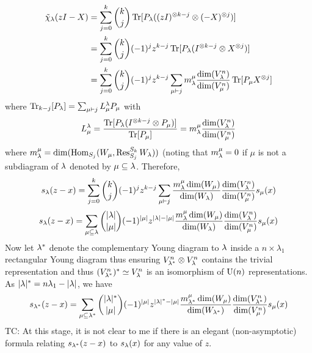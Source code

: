 \documentclass[notitlepage, 10pt]{article}
\begin{document}
    \begin{align}
        \tilde \chi_{\lambda}(zI-X) 
        &= \sum_{j=0}^{k} \binom{k}{j} \operatorname{Tr}[P_{\lambda} ((zI)^{\otimes k-j}\otimes (-X)^{\otimes j})] \\
        &= \sum_{j=0}^{k} \binom{k}{j} (-1)^{j}z^{k-j} \operatorname{Tr}[P_{\lambda} (I^{\otimes k-j} \otimes X^{\otimes j})] \\
        &= \sum_{j=0}^{k} \binom{k}{j} (-1)^{j}z^{k-j} \sum_{\mu\vdash j} m^{\mu}_{\lambda} \frac{\dim(V_{\lambda}^{n})}{\dim(V_{\mu}^{n})} \operatorname{Tr}[P_{\mu}X^{\otimes j}]
    \end{align}
    where $\operatorname{Tr}_{k-j}[P_{\lambda}] = \sum_{\mu\vdash j} L^{\lambda}_{\mu} P_{\mu}$ with 
    \begin{equation}
        L^{\lambda}_{\mu} = \frac{\operatorname{Tr}[P_{\lambda}(I^{\otimes k-j}\otimes P_{\mu})]}{\operatorname{Tr}[P_{\mu}]} =  m^{\mu}_{\lambda}\frac{\dim(V_{\lambda}^{n})}{\dim(V_{\mu}^{n})}
    \end{equation}
    where $m^{\mu}_{\lambda} = \dim(\operatorname{Hom}_{S_j}(W_{\mu}, \operatorname{Res}^{S_k}_{S_j} W_{\lambda}))$ (noting that $m^{\mu}_{\lambda} = 0$ if $\mu$ is not a subdiagram of $\lambda$ denoted by $\mu \subseteq \lambda$.
    Therefore,
    \begin{equation}
        s_{\lambda}(z-x) = \sum_{j=0}^{k} \binom{k}{j} (-1)^{j}z^{k-j} \sum_{\mu\vdash j} \frac{m^{\mu}_{\lambda} \dim(W_{\mu})}{\dim(W_{\lambda})} \frac{\dim(V_{\lambda}^{n})}{\dim(V_{\mu}^{n})} s_{\mu}(x)
    \end{equation}
    \begin{equation}
        s_{\lambda}(z-x) = \sum_{\mu \subseteq \lambda} \binom{{|\lambda|}}{\left|\mu\right|} (-1)^{\left|\mu\right|}z^{{|\lambda|}-\left|\mu\right|} \frac{m^{\mu}_{\lambda} \dim(W_{\mu})}{\dim(W_{\lambda})} \frac{\dim(V_{\lambda}^{n})}{\dim(V_{\mu}^{n})} s_{\mu}(x)
    \end{equation}
    Now let $\lambda^{*}$ denote the complementary Young diagram to $\lambda$ inside a $n\times \lambda_1$ rectangular Young diagram thus ensuring $V_{\lambda^{*}}^n \otimes V_{\lambda}^n$ contains the trivial representation and thus $(V_{\lambda^{*}}^{n})^{*} \simeq V_{\lambda}^{n}$ is an isomorphism of $\operatorname{U}(n)$ representations.
    As ${|\lambda|^{*}} = n\lambda_1 - \left|\lambda\right|$, we have
    \begin{equation}
        s_{\lambda^{*}}(z-x) = \sum_{\mu \subseteq \lambda^{*}} \binom{{|\lambda|^{*}}}{\left|\mu\right|} (-1)^{\left|\mu\right|}z^{{|\lambda|^{*}}-\left|\mu\right|} \frac{m^{\mu}_{\lambda^{*}} \dim(W_{\mu})}{\dim(W_{\lambda^{*}})} \frac{\dim(V_{\lambda^{*}}^{n})}{\dim(V_{\mu}^{n})} s_{\mu}(x)
    \end{equation}
    TC: At this stage, it is not clear to me if there is an elegant (non-asymptotic) formula relating $s_{\lambda^{*}}(z-x)$ to $s_{\lambda}(x)$ for any value of $z$.
\end{document}
